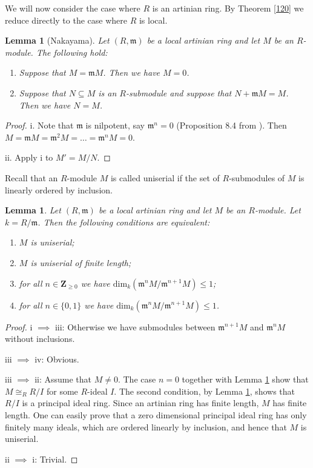 \documentclass{amsart}
\theoremstyle{plain}
\newtheorem{lemma}[theorem]{Lemma}
\theoremstyle{definition}
\begin{document}
We will now consider the case where $R$ is an artinian ring. By Theorem \ref{120} we reduce directly to the case where $R$ is local.

\begin{lemma}[Nakayama] \label{96}
 Let $(R,{\mathfrak{m}})$ be a local artinian ring and let $M$ be an $R$-module. The following hold:
\begin{enumerate}
 \item Suppose that $M={\mathfrak{m}} M$. Then we have $M=0$.
 \item Suppose that $N \subseteq M$ is an $R$-submodule and suppose that $N+{\mathfrak{m}} M=M$. Then we have $N=M$.
\end{enumerate}
\end{lemma}
\begin{proof}
 i. Note that ${\mathfrak{m}}$ is nilpotent, say ${\mathfrak{m}}^n=0$ (Proposition 8.4 from \cite{AT}). Then $M={\mathfrak{m}} M = {\mathfrak{m}}^2 M = \ldots = {\mathfrak{m}}^n M=0$. 
 
 ii. Apply i to $M'=M/N$. 
\end{proof}

Recall that an $R$-module $M$ is called uniserial if the set of $R$-submodules of $M$ is linearly ordered by inclusion.

\begin{lemma} \label{90}
 Let $(R,{\mathfrak{m}})$ be a local artinian ring and let $M$ be an $R$-module. Let $k=R/{\mathfrak{m}}$. Then the following conditions are equivalent:
\begin{enumerate}
 \item $M$ is uniserial;
 \item $M$ is uniserial of finite length;  
 \item for all $n \in {\mathbf{Z}}_{\geq 0}$ we have $\mathrm{dim}_k({\mathfrak{m}}^n M /{\mathfrak{m}}^{n+1}M) \leq 1$;
 \item for all $n \in \{0,1\}$ we have $\mathrm{dim}_k({\mathfrak{m}}^n M /{\mathfrak{m}}^{n+1}M) \leq 1$.
\end{enumerate}
\end{lemma}
\begin{proof}
 i $\implies$ iii: Otherwise we have submodules between ${\mathfrak{m}}^{n+1}M$ and ${\mathfrak{m}}^n M$ without inclusions. 

 iii $\implies$ iv: Obvious.

 iii $\implies$ ii: Assume that $M \neq 0$. The case $n=0$ together with Lemma \ref{96} show that $M \cong_R R/I$ for some $R$-ideal $I$. The second
condition, by Lemma
\ref{96}, shows that $R/I$ is a principal ideal ring. Since an artinian ring has finite length, $M$ has finite length. One can easily prove that a
zero dimensional principal ideal ring has only finitely many ideals,
which are ordered linearly by inclusion, and hence that $M$ is uniserial.

ii $\implies$ i: Trivial. 
\end{proof}
\end{document}
